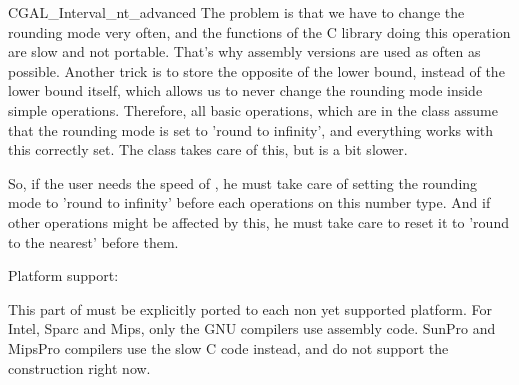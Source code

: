\begin{ccAdvanced}
\begin{ccClass} {CGAL_Interval_nt_advanced}
The problem is that we have to change the rounding mode very often, and the
functions of the C library doing this operation are slow and not portable.
That's why assembly versions are used as often as possible.
Another trick is to store the opposite of the lower bound, instead of the
lower bound itself, which allows us to never change the rounding mode inside
simple operations.  Therefore, all basic operations, which are in the class 
 assume that the rounding mode is set to 
'round to infinity', and everything works with this correctly set.  
The class  takes care of this, but is a bit slower.

So, if the user needs the speed of , he must
take care of setting the rounding mode to 'round to infinity' before each
operations on this number type.  And if other operations might be affected by
this, he must take care to reset it to 'round to the nearest' before them.


Platform support:

This part of {\cgal} must be explicitly ported to each non yet supported
platform.  For Intel, Sparc and Mips, only the GNU compilers use assembly
code.  SunPro and MipsPro compilers use the slow C code instead, and do not
support the construction  right now.


\end{ccClass}
\end{ccAdvanced}
